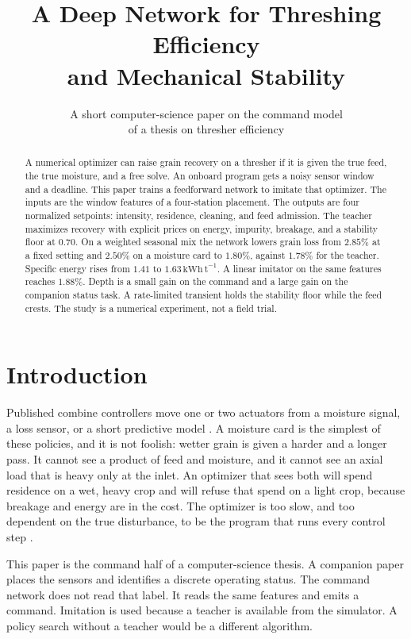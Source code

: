\documentclass[11pt,a4paper]{article}
\title{A Deep Network for Threshing Efficiency\\and Mechanical Stability}
\author{A short computer-science paper on the command model\\of a thesis on thresher efficiency}
\date{}
\begin{document}
\maketitle
\thispagestyle{empty}

\begin{abstract}
\noindent
A numerical optimizer can raise grain recovery on a thresher if it is given the true feed, the true moisture, and a free solve. An onboard program gets a noisy sensor window and a deadline. This paper trains a feedforward network to imitate that optimizer. The inputs are the window features of a four-station placement. The outputs are four normalized setpoints: intensity, residence, cleaning, and feed admission. The teacher maximizes recovery with explicit prices on energy, impurity, breakage, and a stability floor at \(0.70\). On a weighted seasonal mix the network lowers grain loss from \(2.85\%\) at a fixed setting and \(2.50\%\) on a moisture card to \(1.80\%\), against \(1.78\%\) for the teacher. Specific energy rises from \(1.41\) to \(1.63\,\mathrm{kWh\,t^{-1}}\). A linear imitator on the same features reaches \(1.88\%\). Depth is a small gain on the command and a large gain on the companion status task. A rate-limited transient holds the stability floor while the feed crests. The study is a numerical experiment, not a field trial.
\end{abstract}

\section{Introduction}

Published combine controllers move one or two actuators from a moisture signal, a loss sensor, or a short predictive model \cite{craessaerts2010,coen2008,chen2025}. A moisture card is the simplest of these policies, and it is not foolish: wetter grain is given a harder and a longer pass. It cannot see a product of feed and moisture, and it cannot see an axial load that is heavy only at the inlet. An optimizer that sees both will spend residence on a wet, heavy crop and will refuse that spend on a light crop, because breakage and energy are in the cost. The optimizer is too slow, and too dependent on the true disturbance, to be the program that runs every control step \cite{nocedal2006,rawlings2017}.

This paper is the command half of a computer-science thesis. A companion paper places the sensors and identifies a discrete operating status. The command network does not read that label. It reads the same features and emits a command. Imitation is used because a teacher is available from the simulator. A policy search without a teacher would be a different algorithm.
\end{document}
